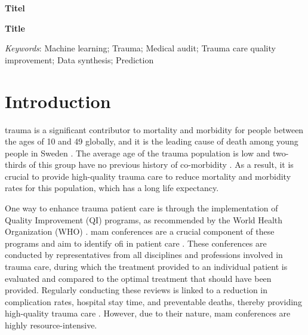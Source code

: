 \documentclass[12pt, letterpaper]{article}
\begin{document}

\begin{titlepage}
    
\end{titlepage}


\textbf{Titel}

\blindtext[2]

\vfill

\textbf{Title}

\blindtext[2]

\vfill

\textit{Keywords}: Machine learning; Trauma; Medical audit; Trauma care quality improvement; Data synthesis; Prediction

\newpage

\glsaddall
\printnoidxglossary[type=acronym,style=csuper]
\printnoidxglossary[style=gsuper]

\newpage
{}


\section{Introduction}
\Gls{trauma} is a significant contributor to mortality and morbidity for people between the ages of 10 and 49 globally, and it is the leading cause of death among young people in Sweden \cite{roth_global_2018, vos_global_2020, sos_death_2021}. The average age of the trauma population is low and two-thirds of this group have no previous history of co-morbidity \cite{brattstrom_socio-economic_2015}. As a result, it is crucial to provide high-quality trauma care to reduce mortality and morbidity rates for this population, which has a long life expectancy.

One way to enhance trauma patient care is through the implementation of Quality Improvement (QI) programs, as recommended by the World Health Organization (WHO) \cite{world_health_organization_guidelines_2009}. \Acrfull{mam}  conferences are a crucial component of these programs and aim to identify \acrfull{ofi} in patient care \cite{santana_development_2014}. These conferences are conducted by representatives from all disciplines and professions involved in trauma care, during which the treatment provided to an individual patient is evaluated and compared to the optimal treatment that should have been provided. Regularly conducting these reviews is linked to a reduction in complication rates, hospital stay time, and preventable deaths, thereby providing high-quality trauma care \cite{stelfox_evidence_2011, mcdermott_trauma_1994}.  However, due to their nature, \acrshort{mam} conferences are highly resource-intensive.
\end{document}
